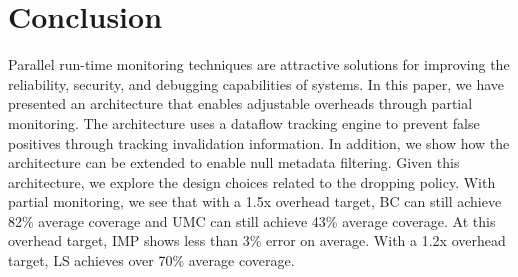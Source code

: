 \section{Conclusion}
\label{sec:conclusion}

Parallel run-time monitoring techniques are attractive solutions for improving
the reliability, security, and debugging capabilities of systems. In this
paper, we have presented an architecture that enables adjustable overheads through partial monitoring. 
The architecture uses a dataflow tracking engine to prevent false positives
through tracking invalidation information. In addition, we show how the
architecture can be extended to enable null metadata filtering.
Given this architecture, we explore the design choices related to the dropping policy.
With partial monitoring, we see that with a 1.5x overhead target, BC can still
achieve 82\% average coverage and UMC can still achieve 43\% average coverage.
At this overhead target, IMP shows less than 3\% error on average.
With a 1.2x overhead target, LS achieves over 70\% average coverage.

